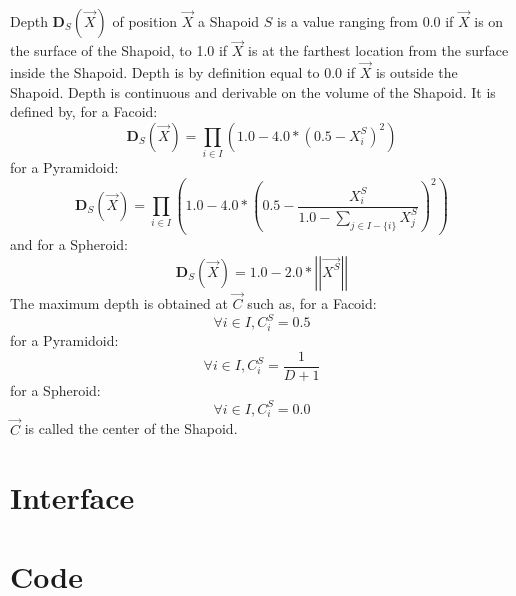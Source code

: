 \documentclass[12pt, a4paper]{article}
\begin{document}
Depth $\mathbf{D}_S(\overrightarrow{X})$ of position $\overrightarrow{X}$ a Shapoid $S$ is a value ranging from 0.0 if $\overrightarrow{X}$ is on the surface of the Shapoid, to 1.0 if $\overrightarrow{X}$ is at the farthest location from the surface inside the Shapoid. Depth is by definition equal to 0.0 if $\overrightarrow{X}$ is outside the Shapoid. Depth is continuous and derivable on the volume of the Shapoid. It is defined by, for a Facoid:\\
\begin{equation}
\mathbf{D}_S(\overrightarrow{X})=\prod_{i\in I}\left(1.0-4.0*(0.5-X^S_i)^2\right)
\end{equation}
for a Pyramidoid:\\
\begin{equation}
\mathbf{D}_S(\overrightarrow{X})=\prod_{i\in I}\left(1.0-4.0*\left(0.5-\frac{X^S_i}{1.0-\sum_{j\in I-\lbrace i\rbrace}X^S_j}\right)^2\right)
\end{equation}
and for a Spheroid:\\
\begin{equation}
\mathbf{D}_S(\overrightarrow{X})=1.0-2.0*\left|\left|\overrightarrow{X^S}\right|\right|
\end{equation}
The maximum depth is obtained at $\overrightarrow{C}$ such as, for a Facoid:\\
\begin{equation}
\forall i\in I,C_i^S=0.5
\end{equation}
for a Pyramidoid:\\
\begin{equation}
\forall i\in I,C_i^S=\frac{1}{D+1}
\end{equation}
for a Spheroid:\\
\begin{equation}
\forall i\in I,C_i^S=0.0
\end{equation}
$\overrightarrow{C}$ is called the center of the Shapoid.

\section{Interface}

\begin{scriptsize}
\begin{ttfamily}

\end{ttfamily}
\end{scriptsize}

\section{Code}
\end{document}
